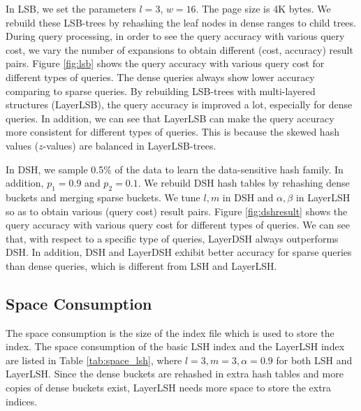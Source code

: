 
 In LSB, we set the parameters $l=3$, $w=16$. The page size is 4K bytes. We rebuild these LSB-trees by rehashing the leaf nodes in dense ranges to child trees. During query processing, in order to see the query accuracy with various query cost, we vary the number of expansions to obtain different (cost, accuracy) result pairs. Figure \ref{fig:lsb} shows the query accuracy with various query cost for different types of queries. The dense queries always show lower accuracy comparing to sparse queries. By rebuilding LSB-trees with multi-layered structures (LayerLSB), the query accuracy is improved a lot, especially for dense queries. In addition, we can see that LayerLSB can make the query accuracy more consistent for different types of queries. This is because the skewed hash values ($z$-values) are balanced in LayerLSB-trees.


 In DSH, we sample 0.5\% of the data to learn the data-sensitive hash family. In addition, $p_1=0.9$ and $p_2=0.1$. We rebuild DSH hash tables by rehashing dense buckets and merging sparse buckets. We tune $l,m$ in DSH and $\alpha,\beta$ in LayerLSH so as to obtain various (query cost) result pairs. Figure \ref{fig:dshresult} shows the query accuracy with various query cost for different types of queries. We can see that, with respect to a specific type of queries, LayerDSH always outperforms DSH. In addition, DSH and LayerDSH exhibit better accuracy for sparse queries than dense queries, which is different from LSH and LayerLSH.

\subsection{Space Consumption}

The space consumption is the size of the index file which is used to store the index. The space consumption of the basic LSH index and the LayerLSH index are listed in Table \ref{tab:space_lsh}, where $l=3, m=3, \alpha=0.9$ for both LSH and LayerLSH. Since the dense buckets are rehashed in extra hash tables and more copies of dense buckets exist, LayerLSH needs more space to store the extra indices.

